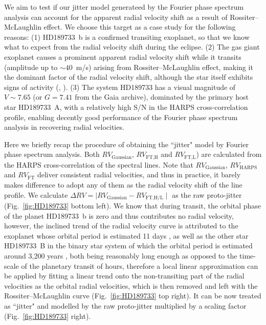 We aim to test if our jitter model generateed by the Fourier phase spectrum analysis can account for the apparent radial velocity shift as a result of Rossiter–McLaughlin effect. We choose this target as a case study for the following reasons: (1) HD189733~b is a confirmed transiting exoplanet, so that we know what to expect from the radial velocity shift during the eclipse. (2) The gas giant exoplanet causes a prominent apparent radial velocity shift while it transits (amplitude up to $\sim 40$~m/s) arising from Rossiter–McLaughlin effect, making it the dominant factor of the radial velocity shift, although the star itself exhibits signs of activity (\cite{Boisse189733}, \cite{Cauley2017}). (3) The system HD189733 has a visual magnitude of $V\sim7.65$ \cite{SIMBAD189733} (or $G=7.41$ from the Gaia archive), dominated by the primary host star HD189733~A, with a relatively high S/N in the HARPS cross-correlation profile, enabling decently good performance of the Fourier phase spectrum analysis in recovering radial velocities.

Here we briefly recap the procedure of obtaining the ``jitter" model by Fourier phase spectrum analysis. Both $RV_\text{Gaussian}$, $RV_\text{FT,H}$ and $RV_\text{FT,L}$) are calculated from the HARPS cross-correlation of the spectral lines. Note that $RV_\text{Gaussian}$, $RV_\text{HARPS}$ and $RV_\text{FT}$ deliver consistent radial velocities, and thus in practice, it barely makes difference to adopt any of them as the radial velocity shift of the line profile. We calculate $\Delta RV = \mid RV_\text{Gaussian} - RV_\text{FT,H/L} \mid$ as the raw proto-jitter (Fig.~\ref{fig:HD189733} bottom left).
We know that during transit, the orbital phase of the planet HD189733~b is zero and thus contributes no radial velocity, however, the inclined trend of the radial velocity curve is attributed to the exoplanet whose orbital period is estimated 11 days \cite{Bouchy2005ELODIE}, as well as the other star HD189733~B in the binary star system of which the orbital period is estimated around 3,200 years \cite{Bakos2006}, both being reasonably long enough as opposed to the time-scale of the planetary transit of hours, therefore a local linear approximation can be applied by fitting a linear trend onto the non-transiting part of the radial velocities as the orbital radial velocities, which is then removed and left with the Rossiter–McLaughlin curve (Fig.~\ref{fig:HD189733} top right). It can be now treated as ``jitter" and modelled by the raw proto-jitter multiplied by a scaling factor (Fig.~\ref{fig:HD189733} right). 

